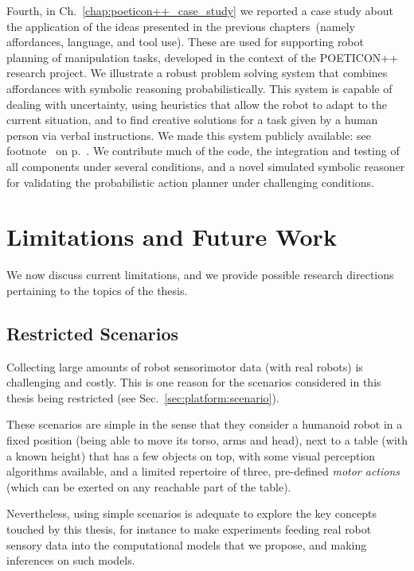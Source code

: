 Fourth, in Ch.~\ref{chap:poeticon++_case_study} we reported a case study about the application of the ideas presented in the previous chapters~(namely affordances, language, and tool use).
These are used for supporting robot planning of manipulation tasks, developed in the context of the POETICON++ research project.
We illustrate a robust problem solving system that combines affordances with symbolic reasoning probabilistically.
This system is capable of dealing with uncertainty, using heuristics that allow the robot to adapt to the current situation, and to find creative solutions for a task given by a human person via verbal instructions.
We made this system publicly available: see footnote~ on p.~\pageref{footnote:poeticon_repo}.
We contribute much of the code, the integration and testing of all components under several conditions, and a novel simulated symbolic reasoner for validating the probabilistic action planner under challenging conditions.

\section{Limitations and Future Work}
\label{sec:final_remarks:limitations_and_future_work}

We now discuss current limitations, and we provide possible research directions pertaining to the topics of the thesis.

\subsection{Restricted Scenarios}

Collecting large amounts of robot sensorimotor data (with real robots) is challenging and costly.
This is one reason for the scenarios considered in this thesis being restricted (see Sec.~\ref{sec:platform:scenario}).

These scenarios are simple in the sense that they consider a humanoid robot in a fixed position (being able to move its torso, arms and head), next to a table (with a known height) that has a few objects on top, with some visual perception algorithms available, and a limited repertoire of three, pre-defined \emph{motor actions} (which can be exerted on any reachable part of the table).

Nevertheless, using simple scenarios is adequate to explore the key concepts touched by this thesis, for instance to make experiments feeding real robot sensory data into the computational models that we propose, and making inferences on such models.

